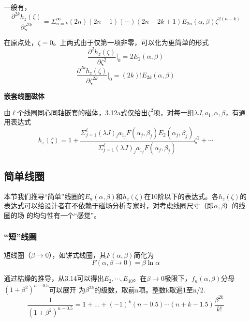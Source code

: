 一般有，
\begin{equation}
 \frac{\partial^{2k} h_z(\zeta)}{\partial \zeta^{2k}}=\Sigma_{n=k}^{\infty} (2n)(2n-1)(\cdots)(2n-2k+1)E_{2n}(\alpha,\beta)\zeta^{2(n-k)}
\end{equation}

在原点处，$\zeta=0$。上两式由于仅第一项非零，可以化为更简单的形式
$$\frac{\partial^2 h_z(\zeta)}{\partial \zeta^2}|_{0}=2 E_{2}(\alpha,\beta)$$
\begin{equation}
 \frac{\partial^{2k} h_z(\zeta)}{\partial \zeta^{2k}}|_{0}=(2k)! E_{2k}(\alpha,\beta)
 \end{equation}

\textbf{嵌套线圈磁体}

由$\ell$个线圈同心同轴嵌套的磁体，3.12a式仅给出$\zeta^2$项，对每一组$\lambda J, a_1, \alpha, \beta$，有通用表达式
\begin{equation}
  h_z(\zeta)=1+\frac{\Sigma_{j=1}^{\ell} (\lambda J)_l a_{1_j}F(\alpha_j,\beta_j)E_2(\alpha_j,\beta_j)}{\Sigma_{j=1}^{\ell}(\lambda J)_j a_{1_j} F(\alpha_j,\beta_j)}\zeta^2+\cdots
\end{equation}

\subsection{简单线圈}
本节我们推导“简单”线圈的$E_n(\alpha,\beta)$和$h_z(\zeta)$在10阶以下的表达式。各$h_z(\zeta)$的表达式可以给设计者在不依赖于磁场分析专家时，对考虑线圈尺寸（即$\alpha, \beta$）的线圈的场
的均匀性有一个“感觉”。
\subsubsection{“短”线圈}
短线圈（$\beta\rightarrow 0 $），如饼式线圈，其$F(\alpha,\beta)$简化为
\begin{equation}
  F(\alpha,\beta\rightarrow 0)=\beta \ln\alpha
\end{equation}

通过枯燥的推导，从3.14可以得出$E_2,\cdots,E_{10}$。在$\beta\rightarrow 0$极限下，$f_n(\alpha,\beta)$分母$(1+\beta^2)^{n-0.5}$可以展开
为$\beta^{2k}$的级数，取前n项。整数k取遍1至n/2.
\begin{equation}
 \frac{1}{(1+\beta^2)^{n-0.5}}=1+...+(-1)^k (n-0.5)\cdots(n+k-1.5)\frac{\beta^{2k}}{k!}
\end{equation}

